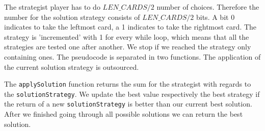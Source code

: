 \documentclass[a4paper,12pt,fleqn]{article}
\newcommand\ezskip{\medskip\noindent}
\begin{document}
\ezskip The strategist player has to do $LEN\_CARDS/2$ number of choices. Therefore the number for the solution strategy consists of $LEN\_CARDS/2$ bits. A bit 0 indicates to take the leftmost card, a 1 indicates to take the rightmost card. The strategy is 'incremented' with 1 for every while loop, which means that all the strategies are tested one after another. We stop if we reached the strategy only containing ones. The pseudocode is separated in two functions. The application of the current solution strategy is outsourced.

\ezskip The \texttt{applySolution} function returns the sum for the strategist with regards to the \texttt{solutionStrategy}. We update the best value respectively the best strategy if the return of a new \texttt{solutionStrategy} is better than our current best solution. After we finished going through all possible solutions we can return the best solution. 
\end{document}
